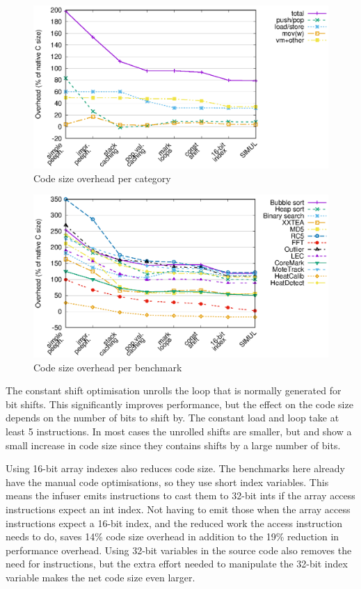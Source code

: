 \begin{figure}
\centering
\includegraphics[width=\mygraphsize]{codesizeoverhead-per-opcode-category.eps}
\caption{Code size overhead per category}
\label{fig-codesize-per-opcode-category}
\end{figure}

\begin{figure}
\centering
\includegraphics[width=\mygraphsize]{codesizeoverhead-per-benchmark.eps}
\caption{Code size overhead per benchmark}
\label{fig-codesize-per-benchmark}
\end{figure}

The constant shift optimisation unrolls the loop that is normally generated for bit shifts. This significantly improves performance, but the effect on the code size depends on the number of bits to shift by. The constant load and loop take at least 5 instructions. In most cases the unrolled shifts are smaller, but  and  show a small increase in code size since they contains shifts by a large number of bits.

Using 16-bit array indexes also reduces code size. The benchmarks here already have the manual code optimisations, so they use short index variables. This means the infuser emits  instructions to cast them to 32-bit ints if the array access instructions expect an int index. Not having to emit those when the array access instructions expect a 16-bit index, and the reduced work the access instruction needs to do, saves 14\% code size overhead in addition to the 19\% reduction in performance overhead. Using 32-bit variables in the source code also removes the need for  instructions, but the extra effort needed to manipulate the 32-bit index variable makes the net code size even larger.

